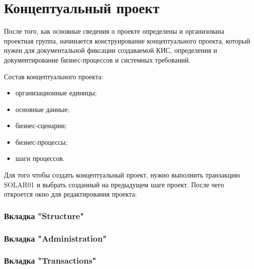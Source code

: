 \chapter{Концептуальный проект}

После того, как основные сведения о проекте определены и организована проектная группа,
начинается конструирование концептуального проекта, который нужен
для документальной фиксации создаваемой КИС, определения и документирование
бизнес-процессов и системных требований.

Состав концептуального проекта:
\begin{itemize}
\item организационные единицы;
\item основные данные;
\item бизнес-сценарии;
\item бизнес-процессы;
\item шаги процессов.
\end{itemize}

Для того чтобы создать концептуальный проект, нужно выполнить транзакцию
SOLAR01 и выбрать созданный на предыдущем шаге проект. После чего
откроется окно для редактирования проекта:


\clearpage
\subsection*{Вкладка "Structure"}


\subsection*{Вкладка "Administration"}

\clearpage
\subsection*{Вкладка "Transactions"}

\clearpage
